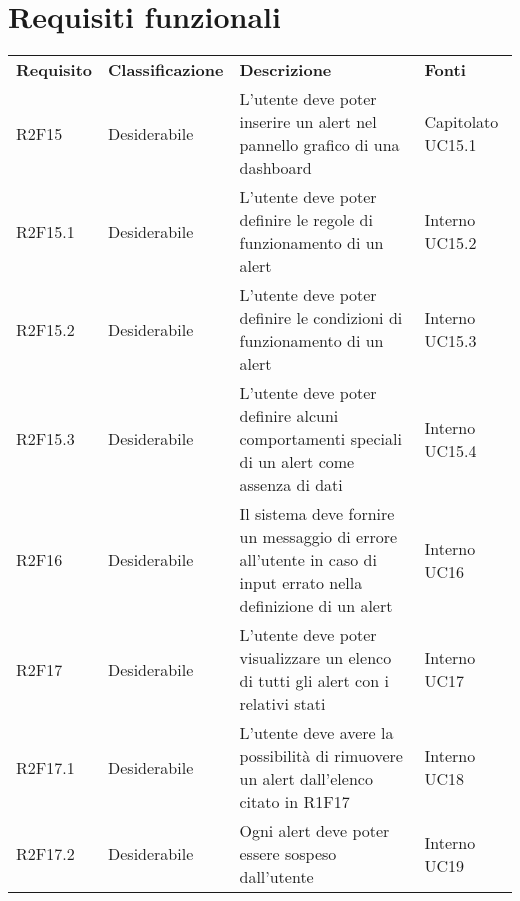 \section{Requisiti funzionali}
	\begin{longtable} {
		>{}p{24mm} 
		>{}p{32mm}
		>{}p{40mm} 
		>{}p{24.5mm}
		}
	\rowcolor{gray!50}
		\textbf{Requisito} & 
		\textbf{Classificazione} & 
		\textbf{Descrizione} & 
		\textbf{Fonti} 	\TBstrut \\
			
		R2F15 &
		Desiderabile &
		L'utente deve poter inserire un alert nel pannello grafico di una dashboard\glo &
		Capitolato UC15.1 \TBstrut \\ [2mm]
		
		R2F15.1 &
		Desiderabile &
		L'utente deve poter definire le regole di funzionamento di un alert &
		Interno UC15.2 \TBstrut \\ [2mm]
		
		R2F15.2 & 
		Desiderabile & 
		L'utente deve poter definire le condizioni di funzionamento di un alert &
		Interno UC15.3 \TBstrut \\ [2mm]
		
		R2F15.3 &
		Desiderabile &
		L'utente deve poter definire alcuni comportamenti speciali di un alert come assenza di dati &
		Interno UC15.4 \TBstrut \\ [2mm]
		
		R2F16 &
		Desiderabile &
		Il sistema deve fornire un messaggio di errore all'utente in caso di input errato nella definizione di un alert &
		Interno UC16 \TBstrut \\ [2mm]
		
		R2F17 &		
		Desiderabile & 
		L'utente deve poter visualizzare un elenco di tutti gli alert con i relativi stati & 
		Interno UC17 \TBstrut \\ [2mm]
		
		R2F17.1 & 
		Desiderabile & 
		L'utente deve avere la possibilità di rimuovere un alert dall'elenco citato in R1F17 & 
		Interno UC18 \TBstrut \\ [2mm]
		
		R2F17.2 &
		Desiderabile & 
		Ogni alert deve poter essere sospeso dall'utente & 
		Interno UC19 \TBstrut \\ [2mm]
		
	\end{longtable}
